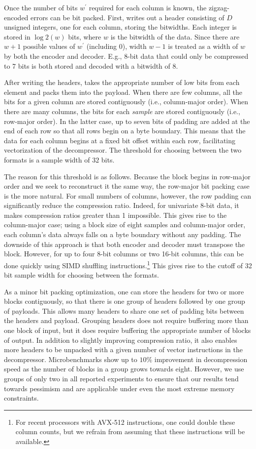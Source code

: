 Once the number of bits $w^\prime$ required for each column is known, the zigzag-encoded errors can be bit packed. First, \minesp writes out a header consisting of $D$ unsigned integers, one for each column, storing the bitwidths. Each integer is stored in $\log2(w)$ bits, where $w$ is the bitwidth of the data. Since there are $w+1$ possible values of $w^\prime$ (including 0), width $w-1$ is treated as a width of $w$ by both the encoder and decoder. E.g., 8-bit data that could only be compressed to 7 bits is both stored and decoded with a bitwidth of 8.

After writing the headers, \minesp takes the appropriate number of low bits from each element and packs them into the payload. When there are few columns, all the bits for a given column are stored contiguously (i.e., column-major order). When there are many columns, the bits for each \textit{sample} are stored contiguously (i.e., row-major order). In the latter case, up to seven bits of padding are added at the end of each row so that all rows begin on a byte boundary. This means that the data for each column begins at a fixed bit offset within each row, facilitating vectorization of the decompressor. The threshold for choosing between the two formats is a sample width of $32$ bits.

The reason for this threshold is as follows. Because the block begins in row-major order and we seek to reconstruct it the same way, the row-major bit packing case is the more natural. For small numbers of columns, however, the row padding can significantly reduce the compression ratio. Indeed, for univariate 8-bit data, it makes compression ratios greater than 1 impossible. This gives rise to the column-major case; using a block size of eight samples and column-major order, each column's data always falls on a byte boundary without any padding. The downside of this approach is that both encoder and decoder must transpose the block. However, for up to four 8-bit columns or two 16-bit columns, this can be done quickly using SIMD shuffling instructions.\footnote{For recent processors with AVX-512 instructions, one could double these column counts, but we refrain from assuming that these instructions will be available.} This gives rise to the cutoff of 32 bit sample width for choosing between the formats.

As a minor bit packing optimization, one can store the headers for two or more blocks contiguously, so that there is one group of headers followed by one group of payloads. This allows many headers to share one set of padding bits between the headers and payload. Grouping headers does not require buffering more than one block of input, but it does require buffering the appropriate number of blocks of output. In addition to slightly improving compression ratio, it also enables more headers to be unpacked with a given number of vector instructions in the decompressor. Microbenchmarks show up to $10\%$ improvement in decompression speed as the number of blocks in a group grows towards eight. However, we use groups of only two in all reported experiments to ensure that our results tend towards pessimism and are applicable under even the most extreme memory constraints.

